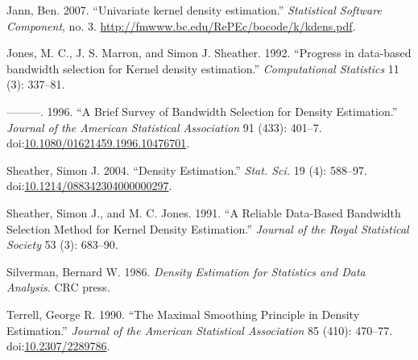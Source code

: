 \documentclass[]{article}
\begin{document}
\hypertarget{ref-Jann2007}{}
Jann, Ben. 2007. ``Univariate kernel density estimation.''
\emph{Statistical Software Component}, no. 3.
\url{http://fmwww.bc.edu/RePEc/bocode/k/kdens.pdf}.

\hypertarget{ref-Jones1992}{}
Jones, M. C., J. S. Marron, and Simon J. Sheather. 1992. ``Progress in
data-based bandwidth selection for Kernel density estimation.''
\emph{Computational Statistics} 11 (3): 337--81.

\hypertarget{ref-Jones1996}{}
---------. 1996. ``A Brief Survey of Bandwidth Selection for Density
Estimation.'' \emph{Journal of the American Statistical Association} 91
(433): 401--7.
doi:\href{https://doi.org/10.1080/01621459.1996.10476701}{10.1080/01621459.1996.10476701}.

\hypertarget{ref-Sheather2004}{}
Sheather, Simon J. 2004. ``Density Estimation.'' \emph{Stat. Sci.} 19
(4): 588--97.
doi:\href{https://doi.org/10.1214/088342304000000297}{10.1214/088342304000000297}.

\hypertarget{ref-Sheather1991}{}
Sheather, Simon J., and M. C. Jones. 1991. ``A Reliable Data-Based
Bandwidth Selection Method for Kernel Density Estimation.''
\emph{Journal of the Royal Statistical Society} 53 (3): 683--90.

\hypertarget{ref-Silverman1986}{}
Silverman, Bernard W. 1986. \emph{Density Estimation for Statistics and
Data Analysis}. CRC press.

\hypertarget{ref-Terrell1990}{}
Terrell, George R. 1990. ``The Maximal Smoothing Principle in Density
Estimation.'' \emph{Journal of the American Statistical Association} 85
(410): 470--77.
doi:\href{https://doi.org/10.2307/2289786}{10.2307/2289786}.
\end{document}
